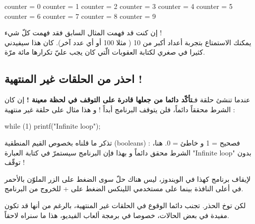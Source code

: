 \begin{Csource}
counter = 0
counter = 1
counter = 2
counter = 3
counter = 4
counter = 5
counter = 6
counter = 7
counter = 8
counter = 9
\end{Csource}

إن كنت قد فهمت المثال السابق فقد فهمت كلّ شيء !\\
يمكنك الاستمتاع بتجربة أعداد أكبر من 10 ( مثلا 100 أو أي عدد آخر). كان هذا سيفيدني كثيرا في صغري لكتابة العقوبات الّتي كان يجب عليّ تكرارها مائة مرّة.

\subsection{احذر من الحلقات غير المنتهية ! }

عندما تنشئ حلقة فـ\textbf{تأكّد دائما من جعلها قادرة على التوقف في لحظة معينة !}
إن كان الشرط محققاً دائماً، فلن يتوقف البرنامج أبداً ! و هذا مثال على حلقة غير منتهية :

\begin{Csource}
while (1)
{
	printf("Infinite loop\n");
}
\end{Csource}

تذكر ما قلناه بخصوص القيم المنطقية 
(\textenglish{booleans}) :
فصحيح = 1 و خاطئ = 0. هنا، الشرط محقق دائماً و بهذا فإن البرنامج سيستمرّ في كتابة العبارة 
"\textenglish{Infinite loop}"
بدون توقّف !

\begin{information}
لإيقاف برنامج كهذا في الويندوز، ليس هناك حلّ سوى الضغط على الزر 
الملوّن بالأحمر في أعلى النافذة بينما على مستخدمي اللينكس الضغط على
 + 
للخروج من البرنامج.
\end{information}
\textbf{\textbf{\textbf{}}}
لكن توخ الحذر. تجنب دائما الوقوع في الحلقات غير المنتهية، بالرغم من أنها قد تكون مفيدة في بعض الحالات، خصوصا في برمجة ألعاب الفيديو، هذا ما سنراه لاحقاً.